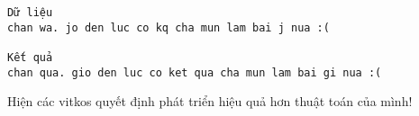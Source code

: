 \begin{verbatim}
Dữ liệu
chan wa. jo den luc co kq cha mun lam bai j nua :(

Kết quả 
chan qua. gio den luc co ket qua cha mun lam bai gi nua :(
\end{verbatim}

   Hiện các vitkos quyết định phát triển hiệu quả hơn thuật toán của mình!